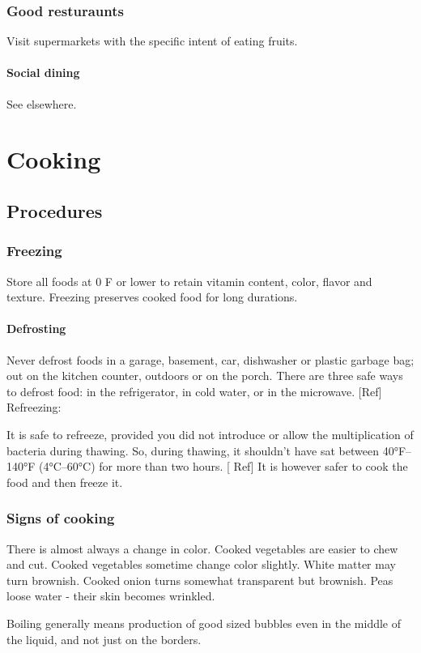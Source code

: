 \documentclass[oneside, article]{memoir}
\begin{document}
\section{Good resturaunts}
Visit supermarkets with the specific intent of eating fruits.

\subsection{Social dining}
See elsewhere.

\part{Cooking}
\chapter{Procedures}
\section{Freezing}
Store all foods at 0 F or lower to retain vitamin content, color, flavor and texture. Freezing preserves cooked food for long durations.

\subsection{Defrosting}
Never defrost foods in a garage, basement, car, dishwasher or plastic garbage bag; out on the kitchen counter, outdoors or on the porch. There are three safe ways to defrost food: in the refrigerator, in cold water, or in the microwave. [Ref]
Refreezing:

It is safe to refreeze, provided you did not introduce or allow the multiplication of bacteria during thawing. So, during thawing, it shouldn't have sat between 40°F–140°F (4°C–60°C) for more than two hours. [ Ref] It is however safer to cook the food and then freeze it.

\section{Signs of cooking}

There is almost always a change in color. Cooked vegetables are easier to chew and cut. Cooked vegetables sometime change color slightly. White matter may turn brownish. Cooked onion turns somewhat transparent but brownish. Peas loose water - their skin becomes wrinkled.

Boiling generally means production of good sized bubbles even in the middle of the liquid, and not just on the borders.
\end{document}
